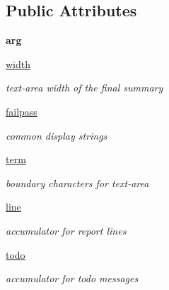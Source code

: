 \subsection*{Public Attributes}
\begin{DoxyCompactItemize}
\item 
\hypertarget{classc_1_1_de_brief_1_1_de_brief_af6654a80aff0df225ba6afc0062adcbe}{}{\bfseries arg}\label{classc_1_1_de_brief_1_1_de_brief_af6654a80aff0df225ba6afc0062adcbe}

\item 
\hypertarget{classc_1_1_de_brief_1_1_de_brief_a690efc77ea8e2fa1249e204fcc222b77}{}\hyperlink{classc_1_1_de_brief_1_1_de_brief_a690efc77ea8e2fa1249e204fcc222b77}{width}\label{classc_1_1_de_brief_1_1_de_brief_a690efc77ea8e2fa1249e204fcc222b77}

\begin{DoxyCompactList}\small\item\em text-\/area width of the final summary \end{DoxyCompactList}\item 
\hypertarget{classc_1_1_de_brief_1_1_de_brief_abd36ae701bd06720247e9d85d9c5a3f5}{}\hyperlink{classc_1_1_de_brief_1_1_de_brief_abd36ae701bd06720247e9d85d9c5a3f5}{failpass}\label{classc_1_1_de_brief_1_1_de_brief_abd36ae701bd06720247e9d85d9c5a3f5}

\begin{DoxyCompactList}\small\item\em common display strings \end{DoxyCompactList}\item 
\hypertarget{classc_1_1_de_brief_1_1_de_brief_a81f823707a14c7d6c23aaed2f70cc40b}{}\hyperlink{classc_1_1_de_brief_1_1_de_brief_a81f823707a14c7d6c23aaed2f70cc40b}{term}\label{classc_1_1_de_brief_1_1_de_brief_a81f823707a14c7d6c23aaed2f70cc40b}

\begin{DoxyCompactList}\small\item\em boundary characters for text-\/area \end{DoxyCompactList}\item 
\hypertarget{classc_1_1_de_brief_1_1_de_brief_ab5fbcfb2eed0334f1c700df98856515c}{}\hyperlink{classc_1_1_de_brief_1_1_de_brief_ab5fbcfb2eed0334f1c700df98856515c}{line}\label{classc_1_1_de_brief_1_1_de_brief_ab5fbcfb2eed0334f1c700df98856515c}

\begin{DoxyCompactList}\small\item\em accumulator for report lines \end{DoxyCompactList}\item 
\hypertarget{classc_1_1_de_brief_1_1_de_brief_ab908674f6121220fcdab67a59853608f}{}\hyperlink{classc_1_1_de_brief_1_1_de_brief_ab908674f6121220fcdab67a59853608f}{todo}\label{classc_1_1_de_brief_1_1_de_brief_ab908674f6121220fcdab67a59853608f}

\begin{DoxyCompactList}\small\item\em accumulator for todo messages \end{DoxyCompactList}\end{DoxyCompactItemize}
